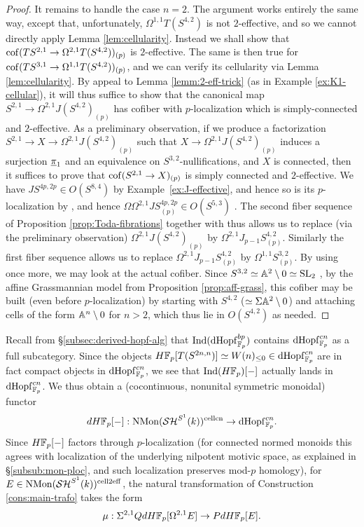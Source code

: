 \documentclass{amsart}
\renewcommand{\NB}[1]{}
\numberwithin{proposition}{section}
\numberwithin{equation}{section}
\def\cell{\mathrm{cell}}
\def\NMon{\mathrm{NMon}}
\def\dHopf{\mathrm{dHopf}}
\def\cn{\mathrm{cn}}
\def\dHFp{dH\F_p}
\begin{document}
\begin{proof}
It remains to handle the case $n=2$.
The argument works entirely the same way, except that, unfortunately, $\Omega^{1,1} T(S^{4,2})$ is not $2$-effective, and so we cannot directly apply Lemma \ref{lem:cellularity}.
Instead we shall show that $\operatorname{cof}(TS^{2,1} \to \Omega^{2,1} T(S^{4,2}))_{(p)}$ is $2$-effective.
The same is then true for $\operatorname{cof}(TS^{3,1} \to \Omega^{1,1} T(S^{4,2}))_{(p)}$, and we can verify its cellularity via Lemma \ref{lem:cellularity}.
By appeal to Lemma \ref{lemm:2-eff-trick} (as in Example \ref{ex:K1-cellular}), it will thus suffice to show that the canonical map $S^{2,1} \to \Omega^{2,1}J(S^{4,2})_{(p)}$ has cofiber with $p$-localization which is simply-connected and $2$-effective.
As a preliminary observation, if we produce a factorization $S^{2,1} \to X \to \Omega^{2,1}J(S^{4,2})_{(p)}$ such that $X \to \Omega^{2,1}J(S^{4,2})_{(p)}$ induces a surjection $\underline\pi_1$ and an equivalence on $S^{3,2}$-nullifications, and $X$ is connected, then it suffices to prove that $\operatorname{cof}(S^{2,1} \to X)_{(p)}$ is simply connected and $2$-effective.
We have $JS^{4p,2p} \in O(S^{8,4})$ by Example~\ref{ex:J-effective}, and hence so is its $p$-localization by \cite[Proposition 4.3.4]{freudenthal}, and hence $\Omega\Omega^{2,1} JS^{4p,2p}_{(p)} \in O(S^{5,3})$ \cite[Proposition 4.2.1]{freudenthal}.
The second fiber sequence of Proposition \ref{prop:Toda-fibrations} together with \cite[Proposition 3.1.23]{freudenthal} thus allows us to replace (via the preliminary observation) $\Omega^{2,1}J(S^{4,2})_{(p)}$ by $\Omega^{2,1} J_{p-1}S^{4,2}_{(p)}$.
Similarly the first fiber sequence allows us to replace $\Omega^{2,1} J_{p-1}S^{4,2}_{(p)}$ by $\Omega^{1,1}S^{3,2}_{(p)}$.
By using \cite[Proposition 4.3.4]{freudenthal} once more, we may look at the actual cofiber.
Since $S^{3,2} \simeq \mathbb A^2 \setminus 0 \simeq \mathrm{SL}_2$ \cite[p.~3, Notation/Preliminaries]{asok2014algebraic}, by the affine Grassmannian model from Proposition \ref{prop:aff-grass}, this cofiber may be built (even before $p$-localization)\NB{details?} by starting with $S^{4,2}$ ($\simeq \Sigma \mathbb A^2 \setminus 0$) and attaching cells of the form $\mathbb A^n \setminus 0$ for $n > 2$, which thus lie in $O(S^{4,2})$ as needed.
\end{proof}

\begin{remark}
Recall from \S\ref{subsec:derived-hopf-alg} that $\Ind(\dHopf_{\F_p}^{bp})$ contains $\dHopf^{cn}_{\F_p}$ as a full subcategory.
Since the objects $H\F_p[T(S^{2n,n})] \wequi W(n)_{\le 0} \in \dHopf^{cn}_{\F_p}$ are in fact compact objects in $\dHopf^{cn}_{\F_p}$, we see that $\mathrm{Ind}(H\mathbb{F}_p)[\mathord-]$ actually lands in $\dHopf^{cn}_{\F_p}$.
We thus obtain a (cocontinuous, nonunital symmetric monoidal) functor \[ \dHFp[\ph]: \NMon(\SH^{S^1}(k))^{\cell\cn} \to \dHopf^{cn}_{\F_p}. \]
Since $H\mathbb{F}_p[\mathord-]$ factors through $p$-localization (for connected normed monoids this agrees with localization of the underlying nilpotent motivic space, as explained in \S\ref{subsub:mon-ploc}, and such localization preserves mod-$p$ homology), for $E \in \NMon(\SH^{S^1}(k))^{\cell 2\eff}$, the natural transformation of Construction \ref{cons:main-trafo} takes the form \[ \mu: \Sigma^{2,1}Q\dHFp[\Omega^{2,1}E] \to P\dHFp[E]. \]
\end{remark}
\end{document}
